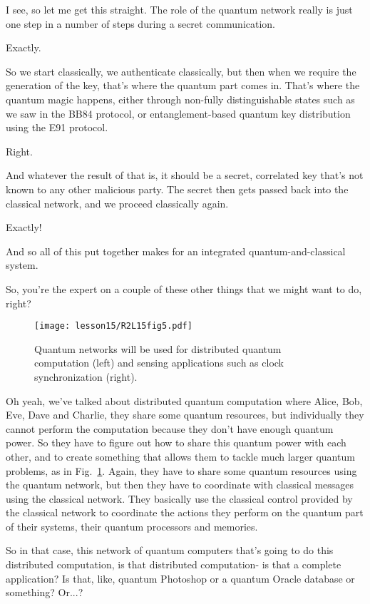 \mmm I see, so let me get this straight. The role of the quantum network really is just one step in a number of steps during a secret communication.

\rrr Exactly.

\mmm So we start classically, we authenticate classically, but then when we require the generation of the key, that's where the quantum part comes in. That's where the quantum magic happens, either through non-fully distinguishable states such as we saw in the BB84 protocol, or entanglement-based quantum key distribution using the E91 protocol.

\rrr Right.

\mmm And whatever the result of that is, it should be a secret, correlated key that's not known to any other malicious party.  The secret then gets passed back into the classical network, and we proceed classically again.

\rrr Exactly!

And so all of this put together makes for an integrated quantum-and-classical system.

So, you're the expert on a couple of these other things that we might want to do, right?

\begin{figure}[t]
    \centering
    \texttt{[image: lesson15/R2L15fig5.pdf]}
    \caption[Uses of quantum networking]{Quantum networks will be used for distributed quantum computation (left) and sensing applications such as clock synchronization (right).}
    \label{fig:15-5-apps}
\end{figure}


\mmm Oh yeah, we've talked about distributed quantum computation where Alice, Bob, Eve, Dave and Charlie, they share some quantum resources, but individually they cannot perform the computation because they don't have enough quantum power. So they have to figure out how to share this quantum power with each other, and to create something that allows them to tackle much larger quantum problems, as in Fig.~\ref{fig:15-5-apps}. Again, they have to share some quantum resources using the quantum network, but then they have to coordinate with classical messages using the classical network. They basically use the classical control provided by the classical network to coordinate the actions they perform on the quantum part of their systems, their quantum processors and memories.

\rrr So in that case, this network of quantum computers that's going to do this distributed computation, is that distributed computation- is that a complete application? Is that, like, quantum Photoshop or a quantum Oracle database or something? Or...?

